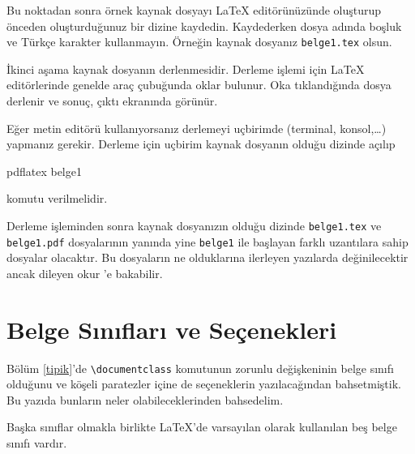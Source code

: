 \documentclass[
  10pt,
]{scrbook}
\newenvironment{Shaded}{}{}
\newcommand{\ExtensionTok}[1]{#1}
\newcommand{\NormalTok}[1]{#1}
\theoremstyle{definition}
\theoremstyle{definition}
\theoremstyle{definition}
\theoremstyle{definition}
\theoremstyle{remark}
\begin{document}
Bu noktadan sonra örnek kaynak dosyayı LaTeX editörünüzünde oluşturup önceden oluşturduğunuz bir dizine kaydedin. Kaydederken dosya adında boşluk ve Türkçe karakter kullanmayın. Örneğin kaynak dosyanız \texttt{belge1.tex} olsun.

İkinci aşama kaynak dosyanın derlenmesidir. Derleme işlemi için LaTeX editörlerinde genelde araç çubuğunda oklar bulunur. Oka tıklandığında dosya derlenir ve sonuç, çıktı ekranında görünür.

Eğer metin editörü kullanıyorsanız derlemeyi uçbirimde (terminal, konsol,\ldots) yapmanız gerekir. Derleme için uçbirim kaynak dosyanın olduğu dizinde açılıp

\begin{Shaded}
\begin{Highlighting}[]
\ExtensionTok{pdflatex}\NormalTok{ belge1}
\end{Highlighting}
\end{Shaded}

komutu verilmelidir.

Derleme işleminden sonra kaynak dosyanızın olduğu dizinde \texttt{belge1.tex} ve \texttt{belge1.pdf} dosyalarının yanında yine \texttt{belge1} ile başlayan farklı uzantılara sahip dosyalar olacaktır. Bu dosyaların ne olduklarına ilerleyen yazılarda değinilecektir ancak dileyen okur \citep[s. 13-14]{Oetiker}'e bakabilir.

\hypertarget{belgesinifi}{%
\section{Belge Sınıfları ve Seçenekleri}\label{belgesinifi}}

Bölüm \ref{tipik}'de \texttt{\textbackslash{}documentclass} komutunun zorunlu değişkeninin belge sınıfı olduğunu ve köşeli paratezler içine de seçeneklerin yazılacağından bahsetmiştik. Bu yazıda bunların neler olabileceklerinden bahsedelim.

Başka sınıflar olmakla birlikte LaTeX'de varsayılan olarak kullanılan beş belge sınıfı vardır.
\end{document}
